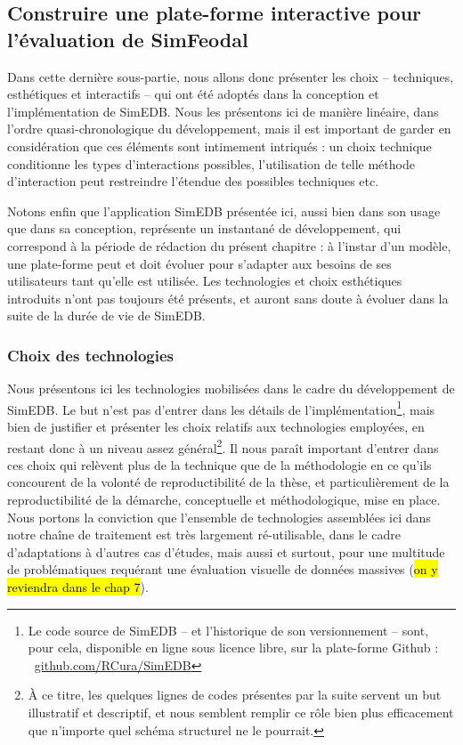 	\subsection{Construire une plate-forme interactive pour l'évaluation de SimFeodal}
	
	Dans cette dernière sous-partie, nous allons donc présenter les choix -- techniques, esthétiques et interactifs -- qui ont été adoptés dans la conception et l'implémentation de SimEDB.
	Nous les présentons ici de manière linéaire, dans l'ordre quasi-chronologique du développement, mais il est important de garder en considération que ces éléments sont intimement intriqués : un choix technique conditionne les types d'interactions possibles, l'utilisation de telle méthode d'interaction peut restreindre l'étendue des possibles techniques etc.
	
	Notons enfin que l'application SimEDB présentée ici, aussi bien dans son usage que dans sa conception, représente un instantané de développement, qui correspond à la période de rédaction du présent chapitre :
	à l'instar d'un modèle, une plate-forme peut et doit évoluer pour s'adapter aux besoins de ses utilisateurs tant qu'elle est utilisée.
	Les technologies et choix esthétiques introduits n'ont pas toujours été présents, et auront sans doute à évoluer dans la suite de la \og durée de vie\fg{} de SimEDB.
	
		\subsubsection{Choix des technologies}
		
	Nous présentons ici les technologies mobilisées dans le cadre du développement de SimEDB.
	Le but n'est pas d'entrer dans les détails de l'implémentation\footnote{
	Le code source de SimEDB -- et l'historique de son versionnement -- sont, pour cela, disponible en ligne sous licence libre, sur la plate-forme Github : 
	\faGithub~\href{https://github.com/RCura/SimEDB}{github.com/RCura/SimEDB}
	}, mais bien de justifier et présenter les choix relatifs aux technologies employées, en restant donc à un niveau assez général\footnote{
		À ce titre, les quelques lignes de codes présentes par la suite servent un but illustratif et descriptif, et nous semblent remplir ce rôle bien plus efficacement que n'importe quel schéma structurel ne le pourrait.
	}.
	Il nous paraît important d'entrer dans ces choix qui relèvent plus de la technique que de la méthodologie en ce qu'ils concourent de la volonté de reproductibilité de la thèse, et particulièrement de la reproductibilité de la démarche, conceptuelle et méthodologique, mise en place.
	Nous portons la conviction que l'ensemble de technologies assemblées ici dans notre \og chaîne de traitement\fg{} est très largement ré-utilisable, dans le cadre d'adaptations à d'autres cas d'études, mais aussi et surtout, pour une multitude de problématiques requérant une évaluation visuelle de données massives (\hl{on y reviendra dans le chap 7}).

